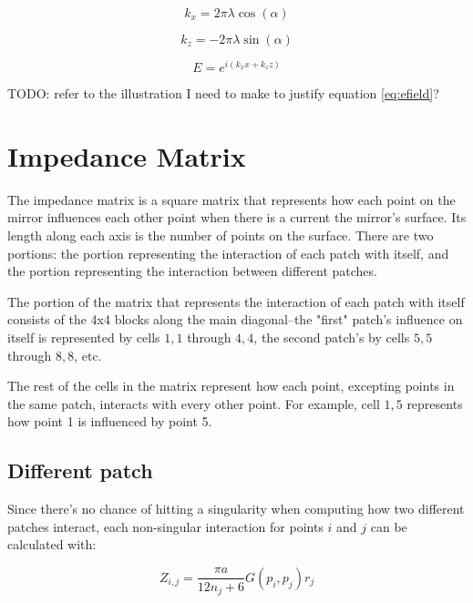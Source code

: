 \documentclass[etd,senior,noacknowledgments]{BYUPhys}
\begin{document}
\begin{equation}
  k_{x}=2\pi\lambda\cos\left(\alpha\right)
\end{equation}

\begin{equation}
  k_{z}=-2\pi\lambda\sin\left(\alpha\right)
\end{equation}

\begin{equation}
  E=e^{i\left(k_{x}x+k_{z}z\right)}
\end{equation}

TODO: refer to the illustration I need to make to justify equation \ref{eq:efield}?



\section{Impedance Matrix} \label{sec:impedance}

The impedance matrix is a square matrix that represents how each point on the mirror influences each other point when there is a current the mirror's surface. Its length along each axis is the number of points on the surface. There are two portions: the portion representing the interaction of each patch with itself, and the portion representing the interaction between different patches.

The portion of the matrix that represents the interaction of each patch with itself consists of the 4x4 blocks along the main diagonal--the "first" patch's influence on itself is represented by cells $1,1$ through $4,4$, the second patch's by cells $5,5$ through $8,8$, etc.

The rest of the cells in the matrix represent how each point, excepting points in the same patch, interacts with every other point. For example, cell $1,5$ represents how point 1 is influenced by point 5.

\subsection{Different patch} \label{sec:different_patch}

Since there's no chance of hitting a singularity when computing how two different patches interact, each non-singular interaction for points $i$ and $j$ can be calculated with:

\begin{equation}
  Z_{i,j}=\frac{\pi a}{12n_{j}+6}G\left(p_{i},p_{j}\right)r_{j}
\end{equation}
\end{document}
